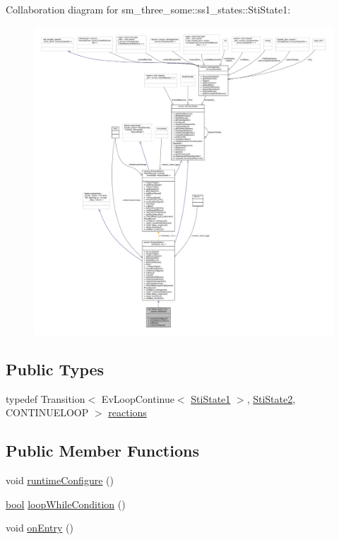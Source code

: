 Collaboration diagram for sm\+\_\+three\+\_\+some\+:\+:ss1\+\_\+states\+:\+:Sti\+State1\+:
\nopagebreak
\begin{figure}[H]
\begin{center}
\leavevmode
\includegraphics[width=350pt]{structsm__three__some_1_1ss1__states_1_1StiState1__coll__graph}
\end{center}
\end{figure}
\subsection*{Public Types}
\begin{DoxyCompactItemize}
\item 
typedef Transition$<$ Ev\+Loop\+Continue$<$ \hyperlink{structsm__three__some_1_1ss1__states_1_1StiState1}{Sti\+State1} $>$, \hyperlink{structsm__three__some_1_1ss1__states_1_1StiState2}{Sti\+State2}, C\+O\+N\+T\+I\+N\+U\+E\+L\+O\+OP $>$ \hyperlink{structsm__three__some_1_1ss1__states_1_1StiState1_aa86a8bb06736fba512abc8842f26fe1c}{reactions}
\end{DoxyCompactItemize}
\subsection*{Public Member Functions}
\begin{DoxyCompactItemize}
\item 
void \hyperlink{structsm__three__some_1_1ss1__states_1_1StiState1_a0037c4751ef43faee050f967c2ac1188}{runtime\+Configure} ()
\item 
\hyperlink{classbool}{bool} \hyperlink{structsm__three__some_1_1ss1__states_1_1StiState1_a815626146e4b45d386ca4b529e330541}{loop\+While\+Condition} ()
\item 
void \hyperlink{structsm__three__some_1_1ss1__states_1_1StiState1_a1d66f8c091e275ffba7f45f5a83872fb}{on\+Entry} ()
\end{DoxyCompactItemize}
